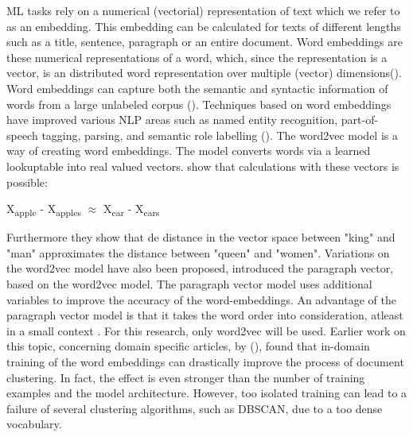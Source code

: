 \documentclass[../../Thesis.tex]{subfiles}
\begin{document}
ML tasks rely on a numerical (vectorial) representation of text which we refer to as an embedding. This embedding can be calculated for texts of different lengths such as a title, sentence, paragraph or an entire document\cite{Karimi2017Deep}. Word embeddings are these numerical representations of a word, which, since the representation is a vector, is an distributed word representation over multiple (vector) dimensions(\citet{mikolov2013distributed}).
Word embeddings can capture both the semantic and syntactic information of words from a large unlabeled corpus (\citet{lai2016generate}).
Techniques based on word embeddings have improved various NLP areas such as named entity recognition, part-of-speech tagging, parsing, and semantic role labelling (\citet{luong2013better}).
The word2vec model is a way of creating word embeddings. The model converts words via a learned lookuptable into real valued vectors\cite{mikolov2013linguistic}. \citet{mikolov2013linguistic} show that calculations with these vectors is possible:
\begin{displayquote}
	X\textsubscript{apple} - X\textsubscript{apples} $\approx$  X\textsubscript{car} - X\textsubscript{cars}
\end{displayquote}
Furthermore they show that de distance in the vector space between "king" and "man" approximates the distance between "queen" and "women". Variations on the word2vec model have also been proposed, \citet{le2014distributed} introduced the paragraph vector, based on the word2vec model. The paragraph vector model uses additional variables to improve the accuracy of the word-embeddings. An advantage of the paragraph vector model is that it takes the word order into consideration, atleast in a small context \cite{le2014distributed}. For this research, only word2vec will be used.
Earlier work on this topic, concerning domain specific articles, by (\citet{Truong2017Thesis}), found that  
in-domain training of the word embeddings can drastically improve the process of document clustering. In fact, the effect is even stronger than the number of training examples and the model architecture. However, too isolated training can lead to a failure of several clustering algorithms, such as DBSCAN, due to a too dense vocabulary\cite{Truong2017Thesis}. 
\end{document}
